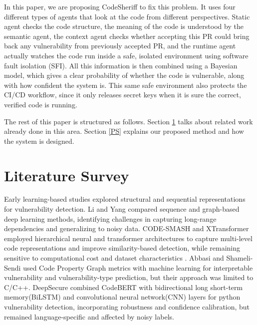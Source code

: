 \documentclass[conference]{IEEEtran}
\begin{document}
In this paper, we are proposing CodeSheriff to fix this problem. It uses four different types of agents that look at the code from different perspectives. Static agent checks the code structure, the meaning of the code is understood by the semantic agent, the context agent checks whether accepting this PR could bring back any vulnerability from previously accepted PR, and the runtime agent actually watches the code run inside a safe, isolated environment using software fault isolation (SFI). All this information is then combined using a Bayesian model, which gives a clear probability of whether the code is vulnerable, along with how confident the system is. This same safe environment also protects the CI/CD workflow, since it only releases secret keys when it is sure the correct, verified code is running.


The rest of this paper is structured as follows. Section \ref{LS} talks about related work already done in this area. Section \ref{PS} explains our proposed method and how the system is designed.

\section{Literature Survey} \label{LS}

Early learning-based studies explored structural and sequential representations for vulnerability detection. Li and Yang \cite{ref20} compared sequence and graph-based deep learning methods, identifying challenges in capturing long-range dependencies and generalizing to noisy data. CODE-SMASH \cite{ref19} and XTransformer \cite{ref18} employed hierarchical neural and transformer architectures to capture multi-level code representations and improve similarity-based detection, while remaining sensitive to computational cost and dataset characteristics . Abbasi and Shameli-Sendi \cite{ref4} used Code Property Graph metrics with machine learning for interpretable vulnerability and vulnerability-type prediction, but their approach was limited to C/C++. DeepSecure \cite{ref2} combined CodeBERT with bidirectional long short-term memory(BiLSTM) and convolutional neural network(CNN) layers for python vulnerability detection, incorporating robustness and confidence calibration, but remained language-specific and affected by noisy labels.
\end{document}
